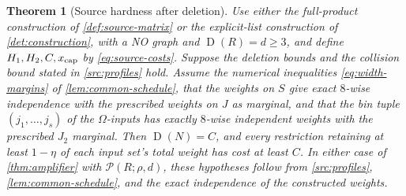 \documentclass[11pt,letterpaper]{article} \usepackage[utf8]{inputenc}
\theoremstyle{plain} \newtheorem{theorem}{Theorem}[section]
\theoremstyle{definition} \newaliascnt{definition}{theorem}
\newcommand{\D}{\operatorname{D}}
\newcommand{\RP}[3]{\mathcal{P}(#1;#2,#3)}
\begin{document}
\begin{theorem}[Source hardness after deletion]\label{src:near-full}
Use either the full-product construction of \cref{def:source-matrix} or the
explicit-list construction of \cref{det:construction}, with a NO graph and
$\D(R)=d\ge3$, and define $H_1,H_2,C,x_{\rm cap}$ by \eqref{eq:source-costs}.
Suppose the deletion bounds and the collision bound stated in
\cref{src:profiles} hold. Assume the numerical inequalities
\eqref{eq:width-margins} of \cref{lem:common-schedule}, that the weights on $S$ give exact $8$-wise
independence with the prescribed weights on $J$ as marginal, and that the bin tuple $(j_1,\ldots,j_s)$ of the $\Omega$-inputs has
exactly $8$-wise independent weights with the prescribed $J_2$ marginal.
Then $\D(N)=C$, and every restriction retaining at least $1-\eta$ of each
input set's total weight has cost at least $C$. In either case of
\cref{thm:amplifier} with $\RP{R}{\rho}{d}$, these hypotheses follow from \cref{src:profiles},
\cref{lem:common-schedule}, and the exact independence of the constructed weights.
\end{theorem}
\end{document}

